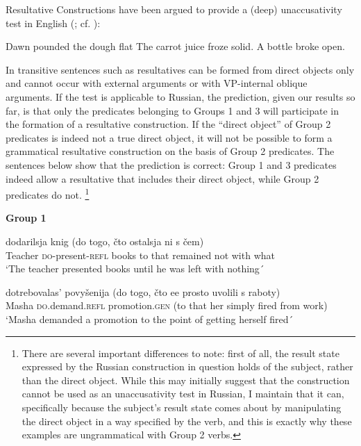 \documentclass[output=paper,colorlinks,citecolor=brown]{./langscibook}
\begin{document}
Resultative Constructions have been argued to provide a (deep) unaccusativity test in English (\citealt{LevinRappaportHovav1995}; cf. \citealt{RappaportHovavLevin2001, Kratzer2005}):


\ea%
    \label{ex:antonyuk:28}
    \ea \label{ex:antonyuk:28a}
    Dawn pounded the dough flat \hfill \citep{Irvin2012}
    \ex \label{ex:antonyuk:28b}
    The carrot juice froze solid.
    \ex \label{ex:antonyuk:28c}
    A bottle broke open.
    \z
\z

In transitive sentences such as  resultatives can be formed from direct objects only and cannot occur with external arguments or with VP-internal oblique arguments. If the test is applicable to Russian, the prediction, given our results so far, is that only the predicates belonging to Groups 1 and 3 will participate in the formation of a resultative construction. If the “direct object” of Group 2 predicates is indeed not a true direct object, it will not be possible to form a grammatical resultative construction on the basis of Group 2 predicates. The sentences below show that the prediction is correct: Group 1 and 3 predicates indeed allow a resultative that includes their direct object, while Group 2 predicates do not. \footnote{There are several important differences to note: first of all, the result state expressed by the Russian construction in question holds of the subject, rather than the direct object. While this may initially suggest that the construction cannot be used as an unaccusativity test in Russian, I maintain that it can, specifically because the subject’s result state comes about by manipulating the direct object in a way specified by the verb, and this is exactly why these examples are ungrammatical with Group 2 verbs.}

\textbf{Group 1}

\ea%
    \label{ex:antonyuk:29}
      {dodarilsja}               {knig}   {(do} {togo,} {čto} {ostalsja}   {ni}   {s}      {čem)}\\
    Teacher \textsc{do}-present-\textsc{refl} books to  that    {}     remained not with what\\
    \glt `The teacher presented books until he was left with nothing´
    \z

\ea%
    \label{ex:antonyuk:30}
       {dotrebovalas’}          {povyšenija}        {(do} {togo,} {čto} {ee} {prosto} {uvolili} s raboty)\\
    Masha \textsc{do}.demand.\textsc{refl} promotion.\textsc{gen} (to  that     {}     her simply fired from work)\\
    \glt `Masha demanded a promotion to the point of getting herself fired´ 
    \z
\end{document}
